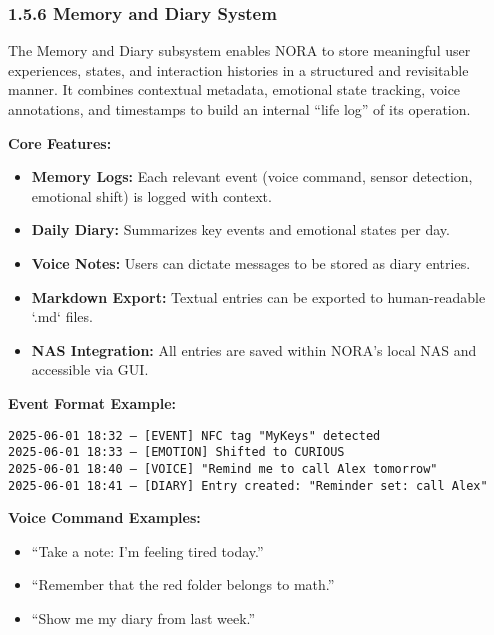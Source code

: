 \subsubsection*{1.5.6 Memory and Diary System}

The Memory and Diary subsystem enables NORA to store meaningful user experiences, states, and interaction histories in a structured and revisitable manner. It combines contextual metadata, emotional state tracking, voice annotations, and timestamps to build an internal “life log” of its operation.

\vspace{0.5cm}

\noindent\textbf{Core Features:}
\begin{itemize}
    \item \textbf{Memory Logs:} Each relevant event (voice command, sensor detection, emotional shift) is logged with context.
    \item \textbf{Daily Diary:} Summarizes key events and emotional states per day.
    \item \textbf{Voice Notes:} Users can dictate messages to be stored as diary entries.
    \item \textbf{Markdown Export:} Textual entries can be exported to human-readable `.md` files.
    \item \textbf{NAS Integration:} All entries are saved within NORA's local NAS and accessible via GUI.
\end{itemize}

\vspace{0.5cm}

\noindent\textbf{Event Format Example:}
\begin{verbatim}
2025-06-01 18:32 — [EVENT] NFC tag "MyKeys" detected
2025-06-01 18:33 — [EMOTION] Shifted to CURIOUS
2025-06-01 18:40 — [VOICE] "Remind me to call Alex tomorrow"
2025-06-01 18:41 — [DIARY] Entry created: "Reminder set: call Alex"
\end{verbatim}

\vspace{0.5cm}

\noindent\textbf{Voice Command Examples:}
\begin{itemize}
    \item “Take a note: I'm feeling tired today.”
    \item “Remember that the red folder belongs to math.”
    \item “Show me my diary from last week.”
\end{itemize}

